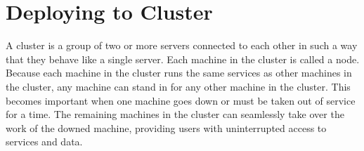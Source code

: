 \documentclass[12pt]{article}
\begin{document}
\begin{itemize}
\begin{figure}[!h]
\end{figure}


\end{itemize}
\clearpage
\newpage
\section{Deploying to Cluster}
A cluster is a group of two or more servers connected to each other in such a way that they behave like a single server. Each machine in the cluster is called a node. Because each machine in the cluster runs the same services as other machines in the cluster, any machine can stand in for any other machine in the cluster. This becomes important when one machine goes down or must be taken out of service for a time. The remaining machines in the cluster can seamlessly take over the work of the downed machine, providing users with uninterrupted access to services and data.
\end{document}
